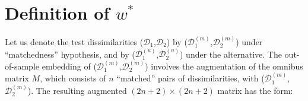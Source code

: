 \documentclass[12pt]{article} %
\begin{document}
\section{Definition of  $w^{*}$}

Let us denote the test dissimilarities ($\mathcal{D}_1$,$\mathcal{D}_2$)  by  ($\mathcal{D}_1^{(m)}$,$\mathcal{D}_2^{(m)}$)  under ``matchedness'' hypothesis, and  by ($\mathcal{D}_1^{(u)}$,$\mathcal{D}_2^{(u)}$)  under the alternative. The out-of-sample embedding of ($\mathcal{D}_1^{(m)}$,$\mathcal{D}_2^{(m)}$) involves the  augmentation of  the omnibus matrix $M$, which consists of $n$ ``matched''  pairs of dissimilarities,  with ($\mathcal{D}_1^{(m)}$,$\mathcal{D}_2^{(m)}$). The resulting augmented  $(2n+2)\times (2n+2)$ matrix  has the form:
\end{document}
